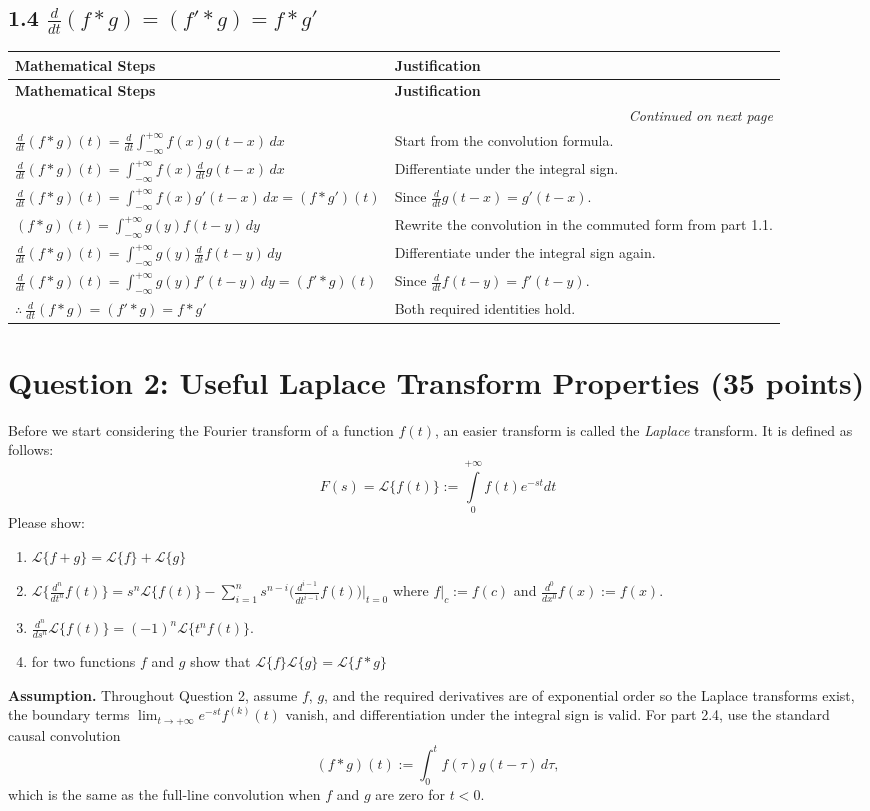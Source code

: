 \documentclass[11pt]{article}
\newcommand{\question}[1]{\section*{\normalsize #1}}
\newenvironment{twocolproof}
{
\renewcommand{\arraystretch}{1.35}
\begin{longtable}{|L{0.60\textwidth}|L{0.30\textwidth}|}
\hline
\textbf{Mathematical Steps} & \textbf{Justification} \\
\hline
\endfirsthead
\hline
\textbf{Mathematical Steps} & \textbf{Justification} \\
\hline
\endhead
\hline
\multicolumn{2}{r}{\textit{Continued on next page}}\\
\endfoot
\hline
\endlastfoot
}
{
\end{longtable}
}
\begin{document}
\subsection*{1.4 \texorpdfstring{$\frac{d}{dt}(f*g)=(f'*g)=f*g'$}{d/dt(f*g)=(f'*g)=f*g'}}
\begin{twocolproof}
\(\displaystyle \frac{d}{dt}(f*g)(t)=\frac{d}{dt}\int_{-\infty}^{+\infty} f(x)g(t-x)\,dx\) & Start from the convolution formula. \\
\(\displaystyle \frac{d}{dt}(f*g)(t)=\int_{-\infty}^{+\infty} f(x)\frac{d}{dt}g(t-x)\,dx\) & Differentiate under the integral sign. \\
\(\displaystyle \frac{d}{dt}(f*g)(t)=\int_{-\infty}^{+\infty} f(x)g'(t-x)\,dx=(f*g')(t)\) & Since \(\frac{d}{dt}g(t-x)=g'(t-x)\). \\
\(\displaystyle (f*g)(t)=\int_{-\infty}^{+\infty} g(y)f(t-y)\,dy\) & Rewrite the convolution in the commuted form from part 1.1. \\
\(\displaystyle \frac{d}{dt}(f*g)(t)=\int_{-\infty}^{+\infty} g(y)\frac{d}{dt}f(t-y)\,dy\) & Differentiate under the integral sign again. \\
\(\displaystyle \frac{d}{dt}(f*g)(t)=\int_{-\infty}^{+\infty} g(y)f'(t-y)\,dy=(f'*g)(t)\) & Since \(\frac{d}{dt}f(t-y)=f'(t-y)\). \\
\(\displaystyle \therefore\ \frac{d}{dt}(f*g)=(f'*g)=f*g'\) & Both required identities hold. \\
\end{twocolproof}
\newpage








\question{Question 2: Useful Laplace Transform Properties (35 points)}
Before we start considering the Fourier transform of a function $f(t)$, an easier transform is called the \textit{Laplace} transform. It is defined as follows:
$$F(s) = \mathcal{L}\{f(t)\}:=\int\limits_{0}^{+\infty} f(t)e^{-st}dt$$
Please show:
\begin{enumerate}
    \item $\mathcal{L}\{f+g\} = \mathcal{L}\{f\}+\mathcal{L}\{g\}$
    \item $\mathcal{L}\{\frac{d^n}{dt^n}f(t)\} = s^n\mathcal{L}\{f(t)\}-\sum\limits_{i=1}^n s^{n-i}\Big(\frac{d^{i-1}}{dt^{i-1}}f(t)\Big) \bigg\rvert_{t=0}$ where $f\rvert_{c} := f(c)$ and $\frac{d^0}{dx^0}f(x) := f(x)$.
    \item $\frac{d^n}{ds^n}\mathcal{L}\{f(t)\} = (-1)^{n}\mathcal{L}\{t^n f(t)\}$.
    \item for two functions $f$ and $g$ show that $\mathcal{L}\{f\}\mathcal{L}\{g\} = \mathcal{L}\{f*g\}$
\end{enumerate}
\noindent\textbf{Assumption.} Throughout Question 2, assume \(f\), \(g\), and the required derivatives are of exponential order so the Laplace transforms exist, the boundary terms \(\lim_{t\to+\infty} e^{-st}f^{(k)}(t)\) vanish, and differentiation under the integral sign is valid. For part 2.4, use the standard causal convolution
\[
(f*g)(t):=\int_{0}^{t} f(\tau)g(t-\tau)\,d\tau,
\]
which is the same as the full-line convolution when \(f\) and \(g\) are zero for \(t<0\).
\end{document}
